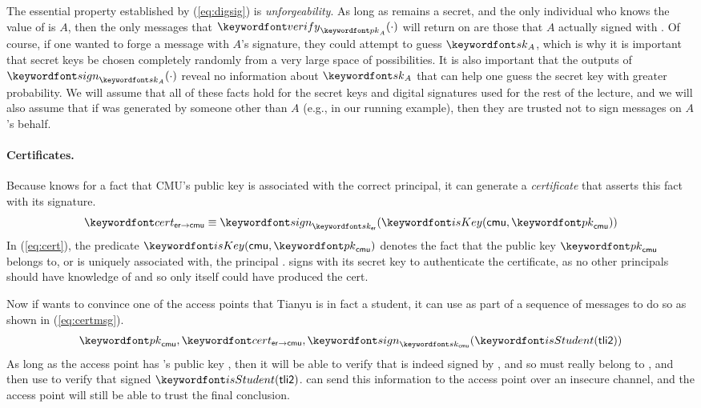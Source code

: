 \documentclass[11pt,twoside]{scrartcl}
\begin{document}
The essential property established by (\ref{eq:digsig}) is \emph{unforgeability}. As long as  remains a secret, and the only individual who knows the value of  is $A$, then the only messages that $\verify{\pk{A}}{\cdot}$ will return \strue on are those that $A$ actually signed with . Of course, if one wanted to forge a message with $A$'s signature, they could attempt to guess $\sk{A}$, which is why it is important that secret keys be chosen completely randomly from a very large space of possibilities. It is also important that the outputs of $\sign{\sk{A}}{\cdot}$ reveal no information about $\sk{A}$ that can help one guess the secret key with greater probability. We will assume that all of these facts hold for the secret keys and digital signatures used for the rest of the lecture, and we will also assume that if  was generated by someone other than $A$ (e.g., \eduroam in our running example), then they are trusted not to sign messages on $A$'s behalf.

\paragraph{Certificates.}
Because \eduroam knows for a fact that CMU's public key \pk{\cmu} is associated with the correct principal, it can generate a \emph{certificate} that asserts this fact with its signature.
\begin{equation}
\label{eq:cert}
\cert{\eduroam}{\cmu} \equiv \sign{\sk{\eduroam}}{\iskey{\cmu}{\pk{\cmu}}}
\end{equation}
In (\ref{eq:cert}), the predicate $\iskey{\cmu}{\pk{\cmu}}$ denotes the fact that the public key $\pk{\cmu}$ belongs to, or is uniquely associated with, the principal \cmu. \eduroam signs with its secret key \sk{\eduroam} to authenticate the certificate, as no other principals should have knowledge of \sk{\eduroam} and so only \eduroam itself could have produced the cert.

Now if \cmu wants to convince one of the access points that Tianyu is in fact a student, it can use \cert{\eduroam}{\cmu} as part of a sequence of messages to do so as shown in (\ref{eq:certmsg}).
\begin{equation}
\label{eq:certmsg}
\pk{\cmu}, \cert{\eduroam}{\cmu}, \sign{\sk{\cmu}}{\isstu(\tli)}
\end{equation}
As long as the access point has \eduroam's public key \pk{\eduroam}, then it will be able to verify that \cert{\eduroam}{\cmu} is indeed signed by \eduroam, and so \pk{\cmu} must really belong to \cmu, and then use \pk{\cmu} to verify that \cmu signed $\isstu(\tli)$. \cmu can send this information to the access point over an insecure channel, and the access point will still be able to trust the final conclusion.
\end{document}
